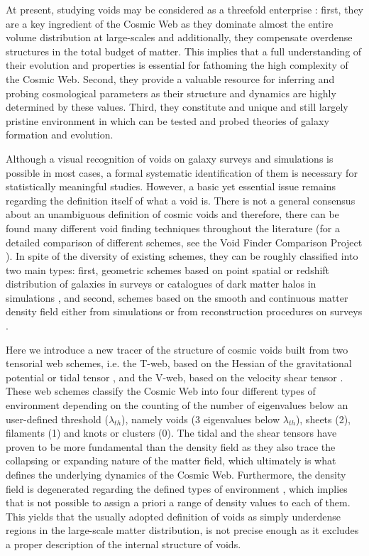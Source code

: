 \documentclass[a4,useAMS,usenatbib,usegraphicx]{latex/mn2e}
\begin{document}
At present, studying voids may be considered as a threefold enterprise
\citep{Platen07}: first, they are a key ingredient of the Cosmic Web as 
they dominate almost the entire volume distribution at large-scales and 
additionally, they compensate overdense structures in the total budget of 
matter. This implies that a full understanding of their evolution and 
properties is essential for fathoming the high complexity of the Cosmic 
Web. Second, they provide a valuable resource for inferring and probing 
cosmological parameters as their structure and dynamics are highly 
determined by these values. Third, they constitute and unique and still 
largely pristine environment in which can be tested and probed theories 
of galaxy formation and evolution.


Although a visual recognition of voids on galaxy surveys and simulations
is possible in most cases, a formal systematic identification of them 
is necessary for statistically meaningful studies. However, a basic yet 
essential issue remains regarding the definition itself of what a void is. 
There is not a general consensus about an unambiguous definition of cosmic 
voids and therefore, there can be found many different void finding 
techniques throughout the literature (for a detailed comparison of 
different schemes, see the Void Finder Comparison Project 
\citet{Colberg08}). In spite of the diversity of existing schemes, they 
can be roughly classified into two main types: first, geometric schemes 
based on point spatial or redshift distribution of galaxies in surveys or 
catalogues of dark matter halos in simulations \citep{Kauffmann91, 
Muller00, Gottlober03, Hoyle04, Brunino07, Foster09, Micheletti14, 
Sutter14}, and second, schemes based on the smooth and continuous matter 
density field either from simulations or from reconstruction procedures 
on surveys \citep{Plionis02, Colberg05, Shandarin06, Platen07, Neyrinck08,
Neyrinck13, Ricciardelli2013}.


Here we introduce a new tracer of the structure of cosmic voids built from 
two tensorial web schemes, i.e. the T-web, based on the Hessian of the 
gravitational potential or tidal tensor \citep{Hahn07, Forero09}, and the 
V-web, based on the velocity shear tensor \citep{Hoffman12}. These web 
schemes classify the Cosmic Web into four different types of environment
depending on the counting of the number of eigenvalues below an 
user-defined threshold ($\lambda_{th}$), namely voids (3 eigenvalues below
$\lambda_{th}$), sheets (2), filaments (1) and knots or clusters (0).
The tidal and the shear tensors have proven to be more fundamental than 
the density field as they also trace the collapsing or expanding nature of 
the matter field, which ultimately is what defines the underlying dynamics 
of the Cosmic Web. Furthermore, the density field is degenerated regarding 
the defined types of environment \citep{Hahn07}, which implies that is not 
possible to assign a priori a range of density values to each of them. 
This yields that the usually adopted definition of voids as simply 
underdense regions in the large-scale matter distribution, is not precise 
enough as it excludes a proper description of the internal structure of 
voids.
\end{document}
